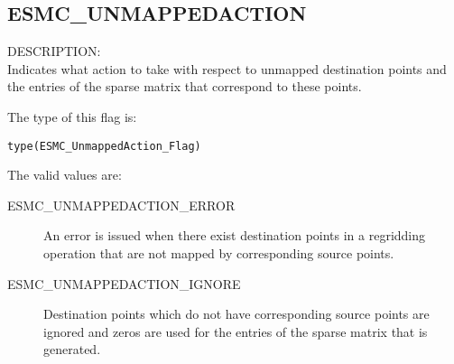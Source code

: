 \subsection{ESMC\_UNMAPPEDACTION}
\label{const:unmappedaction}
{\sf DESCRIPTION:\\}
Indicates what action to take with respect to unmapped destination points
and the entries of the sparse matrix that correspond to these points.

The type of this flag is:

{\tt type(ESMC\_UnmappedAction\_Flag)}

The valid values are:
\begin{description}
	\item[ESMC\_UNMAPPEDACTION\_ERROR]
	An error is issued when there exist destination points in a regridding
	operation that are not mapped by corresponding source points.
	\item[ESMC\_UNMAPPEDACTION\_IGNORE]
	Destination points which do not have corresponding source points are 
	ignored and zeros are used for the entries of the sparse matrix
	that is generated.
\end{description}

